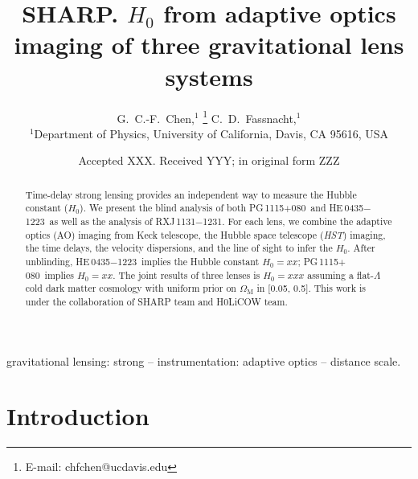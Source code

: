 \documentclass[useAMS,usenatbib]{mnras}
\title[$H_{0}~from~three~lenses~with~AO~imaging$]{SHARP. $H_{0}$ from adaptive optics imaging of three gravitational lens systems}
\author[G.~ C.-F.~Chen et al.]{
G.~C.-F.~Chen,$^{1}$ \thanks{E-mail: chfchen@ucdavis.edu}
C.~D.~Fassnacht,$^{1}$
\newauthor{
}
\newauthor{
}
\\
$^{1}$Department of Physics, University of California, Davis, CA 95616, USA\\
}
\date{Accepted XXX. Received YYY; in original form ZZZ}
\newcommand\rxj{RXJ\,1131$-$1231}
\newcommand\he{HE\,0435$-$1223}
\newcommand\pg{PG\,1115$+$080}
\def\hst{\textit{HST}}
\def\planck{\textit{planck}}
\begin{document}
\label{firstpage}
\pagerange{\pageref{firstpage}--\pageref{lastpage}}
\maketitle

\begin{abstract}
Time-delay strong lensing provides an independent way to measure the Hubble constant ($H_{0}$). 
We present the blind analysis of both \pg~and \he~as well as the analysis of \rxj. For each lens, we combine the adaptive optics (AO) imaging from Keck telescope, the Hubble space telescope (\hst) imaging, the time delays, the velocity dispersions, and the line of sight to infer the $H_{0}$. After unblinding, \he~implies the Hubble constant $H_{0}=xx$; \pg~implies $H_{0}=xx$. The joint results of three lenses is $H_{0}=xxx$ assuming a flat-$\Lambda$ cold dark matter cosmology with uniform prior on $\Omega_{\textrm{M}}$ in [0.05, 0.5]. This work is under the collaboration of SHARP team and H0LiCOW team. 
\end{abstract}

\begin{keywords}
gravitational lensing: strong -- instrumentation: adaptive optics -- distance scale.
\end{keywords}



\section{Introduction}
\end{document}
